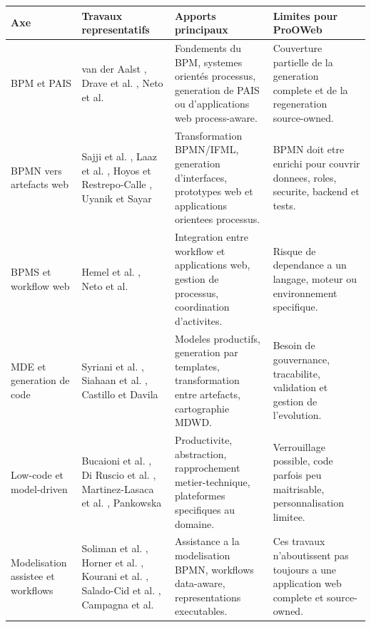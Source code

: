 \documentclass[12pt,a4paper]{article}
\begin{document}
\begin{longtable}{|p{3.2cm}|p{4.2cm}|p{4.3cm}|p{3.4cm}|}
\hline
\textbf{Axe} & \textbf{Travaux representatifs} & \textbf{Apports principaux} & \textbf{Limites pour ProOWeb} \\
\hline
BPM et PAIS & van der Aalst \cite{aalst2013}, Drave et al. \cite{drave2022}, Neto et al. \cite{neto2022} & Fondements du BPM, systemes orientés processus, generation de PAIS ou d'applications web process-aware. & Couverture partielle de la generation complete et de la regeneration source-owned. \\
\hline
BPMN vers artefacts web & Sajji et al. \cite{sajji2022,sajji2023}, Laaz et al. \cite{laaz2020}, Hoyos et Restrepo-Calle \cite{hoyos2017}, Uyanik et Sayar \cite{uyanik2023} & Transformation BPMN/IFML, generation d'interfaces, prototypes web et applications orientees processus. & BPMN doit etre enrichi pour couvrir donnees, roles, securite, backend et tests. \\
\hline
BPMS et workflow web & Hemel et al. \cite{hemel2008}, Neto et al. \cite{neto2022} & Integration entre workflow et applications web, gestion de processus, coordination d'activites. & Risque de dependance a un langage, moteur ou environnement specifique. \\
\hline
MDE et generation de code & Syriani et al. \cite{syriani2018}, Siahaan et al. \cite{siahaan2024}, Castillo et Davila \cite{castillo2024} & Modeles productifs, generation par templates, transformation entre artefacts, cartographie MDWD. & Besoin de gouvernance, tracabilite, validation et gestion de l'evolution. \\
\hline
Low-code et model-driven & Bucaioni et al. \cite{bucaioni2022}, Di Ruscio et al. \cite{diruscio2022}, Martinez-Lasaca et al. \cite{martinez2026}, Pankowska \cite{pankowska2024} & Productivite, abstraction, rapprochement metier-technique, plateformes specifiques au domaine. & Verrouillage possible, code parfois peu maitrisable, personnalisation limitee. \\
\hline
Modelisation assistee et workflows & Soliman et al. \cite{soliman2025}, Horner et al. \cite{horner2026}, Kourani et al. \cite{kourani2025}, Salado-Cid et al. \cite{salado2024}, Campagna et al. \cite{campagna2025} & Assistance a la modelisation BPMN, workflows data-aware, representations executables. & Ces travaux n'aboutissent pas toujours a une application web complete et source-owned. \\
\hline
\end{longtable}
\end{document}
